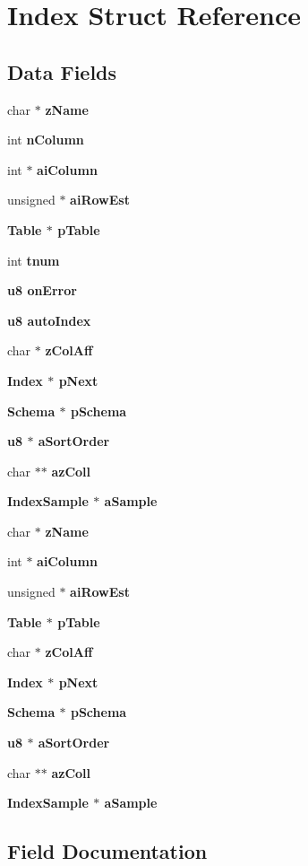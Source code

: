 \section{Index Struct Reference}
\label{structIndex}
\subsection*{Data Fields}
\begin{CompactItemize}
\item 
char $\ast$ \bf{z\-Name}
\item 
int \bf{n\-Column}
\item 
int $\ast$ \bf{ai\-Column}
\item 
unsigned $\ast$ \bf{ai\-Row\-Est}
\item 
\bf{Table} $\ast$ \bf{p\-Table}
\item 
int \bf{tnum}
\item 
\bf{u8} \bf{on\-Error}
\item 
\bf{u8} \bf{auto\-Index}
\item 
char $\ast$ \bf{z\-Col\-Aff}
\item 
\bf{Index} $\ast$ \bf{p\-Next}
\item 
\bf{Schema} $\ast$ \bf{p\-Schema}
\item 
\bf{u8} $\ast$ \bf{a\-Sort\-Order}
\item 
char $\ast$$\ast$ \bf{az\-Coll}
\item 
\bf{Index\-Sample} $\ast$ \bf{a\-Sample}
\item 
char $\ast$ \bf{z\-Name}
\item 
int $\ast$ \bf{ai\-Column}
\item 
unsigned $\ast$ \bf{ai\-Row\-Est}
\item 
\bf{Table} $\ast$ \bf{p\-Table}
\item 
char $\ast$ \bf{z\-Col\-Aff}
\item 
\bf{Index} $\ast$ \bf{p\-Next}
\item 
\bf{Schema} $\ast$ \bf{p\-Schema}
\item 
\bf{u8} $\ast$ \bf{a\-Sort\-Order}
\item 
char $\ast$$\ast$ \bf{az\-Coll}
\item 
\bf{Index\-Sample} $\ast$ \bf{a\-Sample}
\end{CompactItemize}


\subsection{Field Documentation}
